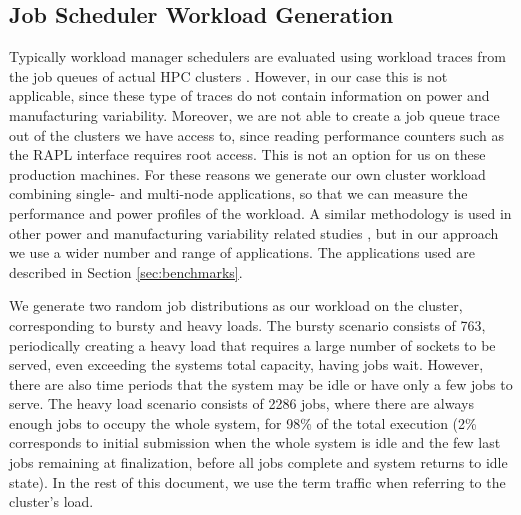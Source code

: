 %

\subsection{Job Scheduler Workload Generation}
\label{sec:cluster_traffic}
Typically workload manager schedulers are evaluated using workload traces from the job
queues of actual HPC clusters \cite{Etinski2012615,FEITELSON20142967}.  However, in our
case this is not applicable, since these type of traces do not contain information on
power and manufacturing variability.  Moreover, we are not able to create a job queue trace
out of the clusters we have access to, since reading performance counters such as the RAPL
interface requires root access.  This is not an option for us on these production
machines.  For these reasons we generate our own cluster workload combining single- and
multi-node applications, so that we can measure the performance and power profiles of the
workload.  A similar methodology is used in other power and manufacturing variability
related studies \cite{Patki:2015:PRM:2749246.2749262,Ellsworth:2015:DPS:2807591.2807643},
but in our approach we use a wider number and range of applications.  The applications
used are described in Section \ref{sec:benchmarks}.  

We generate two random job distributions as our workload on the cluster,
corresponding to bursty and heavy loads.  The bursty scenario consists of 763,
periodically creating a heavy load that requires a large number of sockets to
be served, even exceeding the systems total capacity, having jobs wait.
However, there are also time periods that the system may be idle or have only a
few jobs to serve. The heavy load scenario consists of 2286 jobs, where there
are always enough jobs to occupy the whole system, for 98\% of the total
execution (2\% corresponds to initial submission when the whole system is idle
and the few last jobs remaining at finalization, before all jobs complete and system returns to idle state).  
In the rest of this document, we use the term traffic when referring to the cluster's load. 

